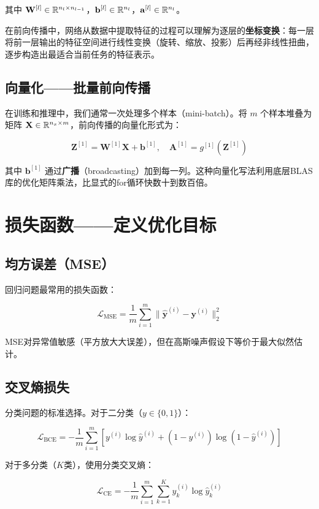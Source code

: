 其中 $\mathbf{W}^{[l]} \in \mathbb{R}^{n_l \times n_{l-1}}$，$\mathbf{b}^{[l]} \in \mathbb{R}^{n_l}$，$\mathbf{a}^{[l]} \in \mathbb{R}^{n_l}$。

在前向传播中，网络从数据中提取特征的过程可以理解为逐层的\textbf{坐标变换}：每一层将前一层输出的特征空间进行线性变换（旋转、缩放、投影）后再经非线性扭曲，逐步构造出最适合当前任务的特征表示。

\subsection{向量化——批量前向传播}

在训练和推理中，我们通常一次处理多个样本（mini-batch）。将 $m$ 个样本堆叠为矩阵 $\mathbf{X} \in \mathbb{R}^{n_x \times m}$，前向传播的向量化形式为：

\[
\mathbf{Z}^{[1]} = \mathbf{W}^{[1]}\mathbf{X} + \mathbf{b}^{[1]}, \quad
\mathbf{A}^{[1]} = g^{[1]}(\mathbf{Z}^{[1]})
\]

其中 $\mathbf{b}^{[1]}$ 通过\textbf{广播}（broadcasting）加到每一列。这种向量化写法利用底层BLAS库的优化矩阵乘法，比显式的for循环快数十到数百倍。

\section{损失函数——定义优化目标}

\subsection{均方误差（MSE）}

回归问题最常用的损失函数：

\[
\mathcal{L}_{\text{MSE}} = \frac{1}{m}\sum_{i=1}^{m} \|\hat{\mathbf{y}}^{(i)} - \mathbf{y}^{(i)}\|_2^2
\]

MSE对异常值敏感（平方放大大误差），但在高斯噪声假设下等价于最大似然估计。

\subsection{交叉熵损失}

分类问题的标准选择。对于二分类（$y \in \{0, 1\}$）：

\[
\mathcal{L}_{\text{BCE}} = -\frac{1}{m}\sum_{i=1}^{m}\left[y^{(i)}\log\hat{y}^{(i)} + (1-y^{(i)})\log(1-\hat{y}^{(i)})\right]
\]

对于多分类（$K$类），使用分类交叉熵：

\[
\mathcal{L}_{\text{CE}} = -\frac{1}{m}\sum_{i=1}^{m}\sum_{k=1}^{K} y_k^{(i)}\log\hat{y}_k^{(i)}
\]

